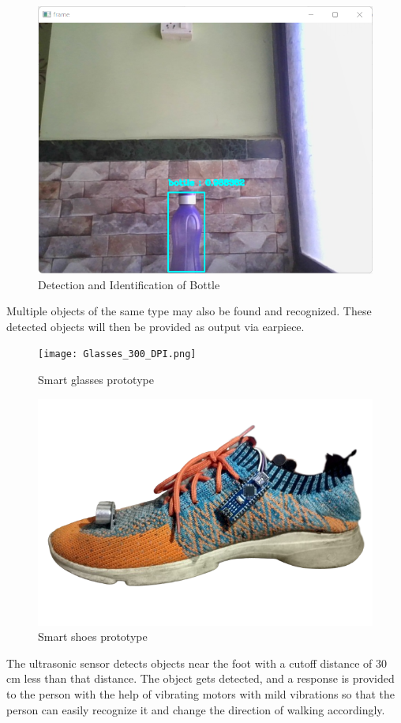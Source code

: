 \documentclass[conference]{IEEEtran}
\begin{document}
\begin{figure}[h]
\centering
\includegraphics[width=2.5in\textwidth]{2023-02-12 14_11_37-frame_300_DPI.png}
\caption{Detection and Identification of Bottle}
\label{fig_sim}
\end{figure}

Multiple objects of the same type may also be found and recognized. These detected objects will then be provided as output via earpiece.


\begin{figure}[h]
\centering
\texttt{[image: Glasses\_300\_DPI.png]}
\caption{Smart glasses prototype}
\label{fig_sim}
\end{figure}

\begin{figure}[h]
\centering
\includegraphics[width=2.5in\textwidth]{prototype_shoe_300_DPI.png}
\caption{Smart shoes prototype}
\label{fig_sim}
\end{figure}

The ultrasonic sensor detects objects near the foot with a cutoff distance of 30 cm less than that distance. The object gets detected, and a response is provided to the person with the help of vibrating motors with mild vibrations so that the person can easily recognize it and change the direction of walking accordingly.
\end{document}

